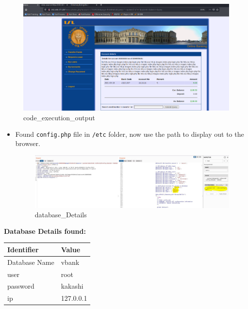 \begin{figure}
\centering
\includegraphics{images/task2/code_execution_output.PNG}
\caption{code\_execution\_output}
\end{figure}

\begin{itemize}
\item
  Found \texttt{config.php} file in \texttt{/etc} folder, now use the
  path to display out to the browser.

\begin{Shaded}
\begin{Highlighting}[]
\end{Highlighting}
\end{Shaded}

  \begin{figure}
  \centering
  \includegraphics{images/task2/6_2.JPG}
  \caption{database\_Details}
  \end{figure}
\end{itemize}

\textbf{Database Details found:}

\begin{longtable}[]{@{}ll@{}}
\toprule
Identifier & Value \\
\midrule
\endhead
Database Name & vbank \\
user & root \\
password & kakashi \\
ip & 127.0.0.1 \\
\bottomrule
\end{longtable}

